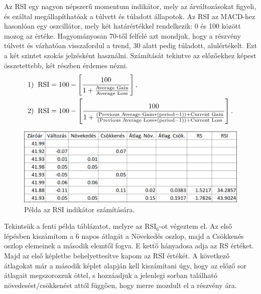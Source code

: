 Az RSI egy nagyon népszerű momentum indikátor, mely az árváltozásokat figyeli, és ezáltal megállapíthatóak a túlvett és túladott állapotok. Az RSI az MACD-hez hasonlóan egy oszcillátor, mely két határértékkel rendelkezik: 0 és 100 között mozog az értéke. Hagyományosan 70-től felfelé azt mondjuk, hogy a részvény túlvett és várhatóan visszafordul a trend, 30 alatt pedig túladott, alulértékelt. Ezt a két szintet szokás jelzésként használni. Számítását tekintve az előzőekhez képest összetettebb, két részben érdemes nézni.
\begin{align*}
1) \hspace*{2mm} \text{RSI} &= 100 - \left[\frac{100}{1+\frac{\text{Average Gain}}{\text{Average Loss}}}\right], \\
2) \hspace*{2mm} \text{RSI} &= 100 - \left[ \frac{100}{1+\frac{(\text{Previous Average Gain}*(\text{period}-1)) + \text{Current Gain}}{(\text{Previous Average Loss} * (\text{period}-1)) + \text{Current Loss}}} \right].
\end{align*}

\begin{figure}[ht]
\centering
\includegraphics[scale=0.25]{images/RSI_calc.png}
\caption{Példa az RSI indikátor számítására.}
\label{fig:rsicalc}
\end{figure}
\noindent Tekintsük a fenti példa táblázatot, melyre az $\text{RSI}_6$-ot végeztem el. Az első lépésben kiszámítom a 6 napos átlagát a Növekedés oszlop, majd a Csökkenés oszlop elemeinek a második elemtől fogva. E kettő hányadosa adja az RS értéket. Majd az első képletbe behelyettesítve kapom az RSI értékét.
A következő átlagokat már a második képlet alapján kell kiszámítani úgy, hogy az előző sor átlagait megszorozzuk öttel, s hozzáadjuk a jelenlegi sorban található növedesést/csökkenést attól függően, hogy merre mozdult el a részvény ára.

